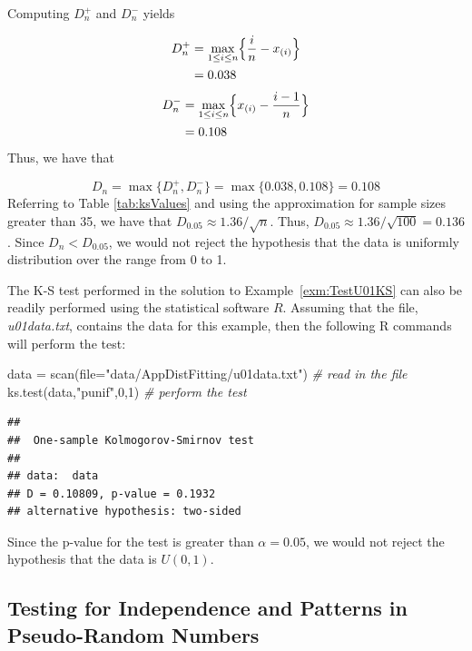 \documentclass[
]{book}
\newenvironment{Shaded}{\begin{snugshade}}{\end{snugshade}}
\newcommand{\AttributeTok}[1]{\textcolor[rgb]{0.77,0.63,0.00}{#1}}
\newcommand{\CommentTok}[1]{\textcolor[rgb]{0.56,0.35,0.01}{\textit{#1}}}
\newcommand{\DecValTok}[1]{\textcolor[rgb]{0.00,0.00,0.81}{#1}}
\newcommand{\FunctionTok}[1]{\textcolor[rgb]{0.00,0.00,0.00}{#1}}
\newcommand{\NormalTok}[1]{#1}
\newcommand{\OtherTok}[1]{\textcolor[rgb]{0.56,0.35,0.01}{#1}}
\newcommand{\StringTok}[1]{\textcolor[rgb]{0.31,0.60,0.02}{#1}}
\theoremstyle{definition}
\theoremstyle{definition}
\theoremstyle{definition}
\theoremstyle{definition}
\theoremstyle{remark}
\begin{document}
\hfill\break
Computing \(D^{+}_{n}\) and \(D^{-}_{n}\) yields

\[\begin{aligned}
 D^{+}_{n} & = \underset{1 \leq i \leq n}{\max} \Bigl\lbrace \frac{i}{n} -  x_{(i)}\Bigr\rbrace \\
  & = 0.038
\end{aligned}
\]
\[
\begin{aligned}
D^{-}_{n} & = \underset{1 \leq i \leq n}{\max} \Bigl\lbrace x_{(i)} - \frac{i-1}{n} \Bigr\rbrace \\
 & = 0.108
\end{aligned}
\]
Thus, we have that

\[D_{n} = \max \lbrace D^{+}_{n}, D^{-}_{n} \rbrace = \max \lbrace 0.038, 0.108 \rbrace = 0.108\]
Referring to Table \ref{tab:ksValues} and using the approximation for sample sizes greater
than 35, we have that \(D_{0.05} \approx 1.36/\sqrt{n}\). Thus,
\(D_{0.05} \approx 1.36/\sqrt{100} = 0.136\). Since \(D_{n} < D_{0.05}\), we
would not reject the hypothesis that the data is uniformly distribution
over the range from 0 to 1.

The K-S test performed in the solution to
Example~\ref{exm:TestU01KS} can also be readily performed using the
statistical software \(R\). Assuming that the file, \emph{u01data.txt},
contains the data for this example, then the following R commands will
perform the test:\\

\begin{Shaded}
\begin{Highlighting}[]
\NormalTok{data }\OtherTok{=} \FunctionTok{scan}\NormalTok{(}\AttributeTok{file=}\StringTok{"data/AppDistFitting/u01data.txt"}\NormalTok{) }\CommentTok{\# read in the file}
\FunctionTok{ks.test}\NormalTok{(data,}\StringTok{"punif"}\NormalTok{,}\DecValTok{0}\NormalTok{,}\DecValTok{1}\NormalTok{) }\CommentTok{\# perform the test}
\end{Highlighting}
\end{Shaded}

\begin{verbatim}
## 
##  One-sample Kolmogorov-Smirnov test
## 
## data:  data
## D = 0.10809, p-value = 0.1932
## alternative hypothesis: two-sided
\end{verbatim}

Since the p-value for the test is greater than \(\alpha = 0.05\), we would
not reject the hypothesis that the data is \(U(0,1)\).

\hypertarget{testing-for-independence-and-patterns-in-pseudo-random-numbers}{%
\subsection{Testing for Independence and Patterns in Pseudo-Random Numbers}\label{testing-for-independence-and-patterns-in-pseudo-random-numbers}}
\end{document}
